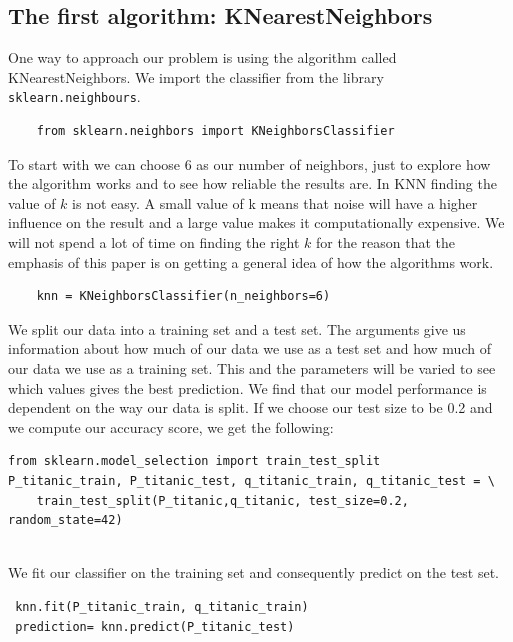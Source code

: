 \documentclass[11pt]{article}
\begin{document}
\newpage
\subsection{The first algorithm: KNearestNeighbors}
\label{sec:orga60402a}

One way to approach our problem is using the algorithm called KNearestNeighbors. We import the classifier from the library \texttt{sklearn.neighbours}. 

\begin{verbatim}
    from sklearn.neighbors import KNeighborsClassifier
\end{verbatim}

To start with we can choose 6 as our number of neighbors, just to explore how the algorithm works and to see how reliable the results are. In KNN finding the value of \(k\) is not easy. A small value of k means that noise will have a higher influence on the result and a large value makes it computationally expensive. We will not spend a lot of time on finding the right \(k\) for the reason that the emphasis of this paper is on getting a general idea of how the algorithms work. 

\begin{verbatim}
    knn = KNeighborsClassifier(n_neighbors=6)
\end{verbatim}

We split our data into a training set and a test set.  The
arguments give us information about how much of our data we use as a
test set and how much of our data we use as a training set. This and
the parameters will be varied to see which values gives the best
prediction. We find that our model performance is dependent on the way our data is split. If we choose our test size to be 0.2 and we compute our accuracy score, we get the following:   


\begin{verbatim}
from sklearn.model_selection import train_test_split
P_titanic_train, P_titanic_test, q_titanic_train, q_titanic_test = \
    train_test_split(P_titanic,q_titanic, test_size=0.2, random_state=42)
 
\end{verbatim}

We fit our classifier on the training set and consequently predict on the test set.  

\begin{verbatim}
 knn.fit(P_titanic_train, q_titanic_train)
 prediction= knn.predict(P_titanic_test) 

\end{verbatim}
\end{document}
